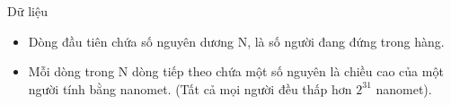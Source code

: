 Dữ liệu  
\begin{itemize}
	\item     Dòng đầu tiên chứa số nguyên dương N, là số người đang đứng trong hàng.   
	\item     Mỗi dòng trong N dòng tiếp theo chứa một số nguyên là chiều cao của một người tính bằng nanomet. (Tất cả mọi người đều thấp hơn $2^{31}$    nanomet).   
\end{itemize}